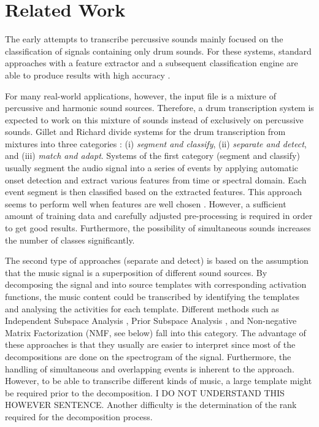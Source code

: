 \documentclass{article}
\begin{document}
\section{Related Work}\label{sec:related works}

The early attempts to transcribe percussive sounds mainly focused on the classification of signals containing only drum sounds. For these systems, standard approaches with a feature extractor and a subsequent classification engine are able to produce results with high accuracy \cite{herrera_automatic_2002, herrera_automatic_2003}. 

For many real-world applications, however, the input file is a mixture of percussive and harmonic sound sources. Therefore, a drum transcription system is expected to work on this mixture of sounds instead of exclusively on percussive sounds. 
Gillet and Richard divide systems for the drum transcription from mixtures into three categories \cite{gillet_transcription_2008}: (i) \textit{segment and classify}, (ii) \textit{separate and detect}, and (iii) \textit{match and adapt}.  Systems of the first category (segment and classify) usually segment the audio signal into a series of events by applying automatic onset detection and extract various features from time or spectral domain. Each event segment is then classified based on the extracted features. 
This approach seems to perform well when features are well chosen \cite{tanghe_algorithm_2005,alves_drum_2009}. However, a sufficient amount of training data and carefully adjusted pre-processing is required in order to get good results. Furthermore, the possibility of  simultaneous sounds increases the number of  classes significantly.

The second type of approaches (separate and detect) is based on the assumption that the music signal is a superposition of different sound sources. By decomposing the signal and into source templates with corresponding activation functions, the music content could be transcribed by identifying the templates and analysing the activities for each template. 
Different methods such as Independent Subspace Analysis \cite{fitzgerald_sub-band_2002}, Prior Subspace Analysis \cite{fitzgerald_drum_2003}, and Non-negative Matrix Factorization (NMF, see below) \cite{paulus_drum_2005,moreau_drum_2007,alves_drum_2009} fall into this category. The advantage of these approaches is that they usually are easier to interpret since most of the decompositions are done on the spectrogram of the signal. Furthermore, the handling of simultaneous and overlapping events is inherent to the approach. However, to be able to transcribe different kinds of music, a large template might be required prior to the decomposition. I DO NOT UNDERSTAND THIS HOWEVER SENTENCE. Another difficulty is the determination of the rank required for the decomposition process.
\end{document}
